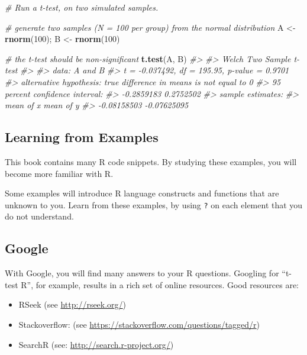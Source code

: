 \documentclass[]{book}
\newenvironment{Shaded}{\begin{snugshade}}{\end{snugshade}}
\newcommand{\KeywordTok}[1]{\textcolor[rgb]{0.13,0.29,0.53}{\textbf{#1}}}
\newcommand{\DecValTok}[1]{\textcolor[rgb]{0.00,0.00,0.81}{#1}}
\newcommand{\StringTok}[1]{\textcolor[rgb]{0.31,0.60,0.02}{#1}}
\newcommand{\CommentTok}[1]{\textcolor[rgb]{0.56,0.35,0.01}{\textit{#1}}}
\newcommand{\NormalTok}[1]{#1}
\begin{document}
\begin{Shaded}
\begin{Highlighting}[]
\CommentTok{# Run a t-test, on two simulated samples.}

\CommentTok{# generate two samples (N = 100 per group) from the normal distribution}
\NormalTok{A <-}\StringTok{ }\KeywordTok{rnorm}\NormalTok{(}\DecValTok{100}\NormalTok{); B <-}\StringTok{ }\KeywordTok{rnorm}\NormalTok{(}\DecValTok{100}\NormalTok{)}

\CommentTok{# the t-test should be non-significant }
\KeywordTok{t.test}\NormalTok{(A, B)}
\CommentTok{#> }
\CommentTok{#>  Welch Two Sample t-test}
\CommentTok{#> }
\CommentTok{#> data:  A and B}
\CommentTok{#> t = -0.037492, df = 195.95, p-value = 0.9701}
\CommentTok{#> alternative hypothesis: true difference in means is not equal to 0}
\CommentTok{#> 95 percent confidence interval:}
\CommentTok{#>  -0.2859183  0.2752502}
\CommentTok{#> sample estimates:}
\CommentTok{#>   mean of x   mean of y }
\CommentTok{#> -0.08158503 -0.07625095}
\end{Highlighting}
\end{Shaded}

\subsection{Learning from Examples}\label{learning-from-examples}

This book contains many R code snippets. By studying these examples, you
will become more familiar with R.

Some examples will introduce R language constructs and functions that
are unknown to you. Learn from these examples, by using \texttt{?} on
each element that you do not understand.

\subsection{Google}\label{google}

With Google, you will find many answers to your R questions. Googling
for ``t-test R'', for example, results in a rich set of online
resources. Good resources are:

\begin{itemize}
\item
  RSeek (see \url{http://rseek.org/})
\item
  Stackoverflow: (see
  \url{https://stackoverflow.com/questions/tagged/r})
\item
  SearchR (see: \url{http://search.r-project.org/})
\end{itemize}
\end{document}
